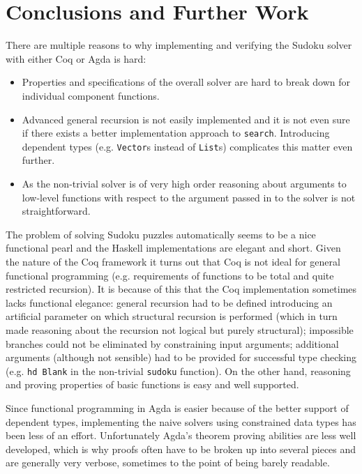 \documentclass[a4paper,11pt]{article}
\begin{document}
\section{Conclusions and Further Work}
\label{sec:conc}
There are multiple reasons to why implementing and verifying the Sudoku solver with either Coq or Agda is hard:
\begin{itemize}
  \item Properties and specifications of the overall solver are hard to break down for individual component functions.
  \item Advanced general recursion is not easily implemented and it is not even sure if there exists a better implementation approach to \texttt{search}. Introducing dependent types (e.g. \texttt{Vector}s instead of \texttt{List}s) complicates this matter even further.
  \item As the non-trivial solver is of very high order reasoning about arguments to low-level functions with respect to the argument passed in to the solver is not straightforward.
\end{itemize}

The problem of solving Sudoku puzzles automatically seems to be a nice functional pearl and the Haskell implementations are elegant and short. Given the nature of the Coq framework it turns out that Coq is not ideal for general functional programming (e.g. requirements of functions to be total and quite restricted recursion). It is because of this that the Coq implementation sometimes lacks functional elegance: general recursion had to be defined introducing an artificial parameter on which structural recursion is performed (which in turn made reasoning about the recursion not logical but purely structural); impossible branches could not be eliminated by constraining input arguments; additional arguments (although not sensible) had to be provided for successful type checking (e.g. \texttt{hd Blank} in the non-trivial \texttt{sudoku} function). On the other hand, reasoning and proving properties of basic functions is easy and well supported.

Since functional programming in Agda is easier because of the better support of dependent types, implementing the naive solvers using constrained data types has been less of an effort. Unfortunately Agda's theorem proving abilities are less well developed, which is why proofs often have to be broken up into several pieces and are generally very verbose, sometimes to the point of being barely readable. 
\end{document}
